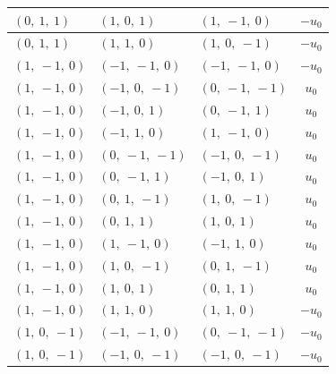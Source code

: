 \documentclass[11pt]{article}
\theoremstyle{definition}
\begin{document}
\begin{longtable}{|l|l|l|c|}
    \hline
    $\left( 0, \  1, \  1\right)$ & $\left( 1, \  0, \  1\right)$ & $\left( 1, \  -1, \  0\right)$ & $- u_{0}$ \\
    \hline
    $\left( 0, \  1, \  1\right)$ & $\left( 1, \  1, \  0\right)$ & $\left( 1, \  0, \  -1\right)$ & $- u_{0}$ \\
    \hline
    $\left( 1, \  -1, \  0\right)$ & $\left( -1, \  -1, \  0\right)$ & $\left( -1, \  -1, \  0\right)$ & $- u_{0}$ \\
    \hline
    $\left( 1, \  -1, \  0\right)$ & $\left( -1, \  0, \  -1\right)$ & $\left( 0, \  -1, \  -1\right)$ & $u_{0}$ \\
    \hline
    $\left( 1, \  -1, \  0\right)$ & $\left( -1, \  0, \  1\right)$ & $\left( 0, \  -1, \  1\right)$ & $u_{0}$ \\
    \hline
    $\left( 1, \  -1, \  0\right)$ & $\left( -1, \  1, \  0\right)$ & $\left( 1, \  -1, \  0\right)$ & $u_{0}$ \\
    \hline
    $\left( 1, \  -1, \  0\right)$ & $\left( 0, \  -1, \  -1\right)$ & $\left( -1, \  0, \  -1\right)$ & $u_{0}$ \\
    \hline
    $\left( 1, \  -1, \  0\right)$ & $\left( 0, \  -1, \  1\right)$ & $\left( -1, \  0, \  1\right)$ & $u_{0}$ \\
    \hline
    $\left( 1, \  -1, \  0\right)$ & $\left( 0, \  1, \  -1\right)$ & $\left( 1, \  0, \  -1\right)$ & $u_{0}$ \\
    \hline
    $\left( 1, \  -1, \  0\right)$ & $\left( 0, \  1, \  1\right)$ & $\left( 1, \  0, \  1\right)$ & $u_{0}$ \\
    \hline
    $\left( 1, \  -1, \  0\right)$ & $\left( 1, \  -1, \  0\right)$ & $\left( -1, \  1, \  0\right)$ & $u_{0}$ \\
    \hline
    $\left( 1, \  -1, \  0\right)$ & $\left( 1, \  0, \  -1\right)$ & $\left( 0, \  1, \  -1\right)$ & $u_{0}$ \\
    \hline
    $\left( 1, \  -1, \  0\right)$ & $\left( 1, \  0, \  1\right)$ & $\left( 0, \  1, \  1\right)$ & $u_{0}$ \\
    \hline
    $\left( 1, \  -1, \  0\right)$ & $\left( 1, \  1, \  0\right)$ & $\left( 1, \  1, \  0\right)$ & $- u_{0}$ \\
    \hline
    $\left( 1, \  0, \  -1\right)$ & $\left( -1, \  -1, \  0\right)$ & $\left( 0, \  -1, \  -1\right)$ & $- u_{0}$ \\
    \hline
    $\left( 1, \  0, \  -1\right)$ & $\left( -1, \  0, \  -1\right)$ & $\left( -1, \  0, \  -1\right)$ & $- u_{0}$ \\

\end{longtable}
\end{document}
